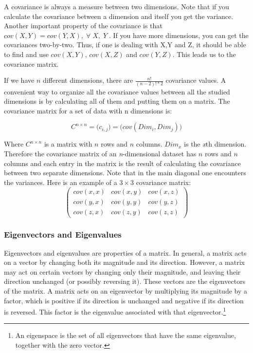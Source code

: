 \documentclass[12pt]{article}
\begin{document}
A covariance is always a measure between two dimensions. Note that if you calculate
the covariance between a dimension and itself you get the variance. Another important
property of the covariance is that $cov(X,Y)=cov(Y,X),\; \forall \; X,\;Y\;$. If you have more dimensions,
you can get the covariances two-by-two. Thus, if one is dealing with X,Y and Z, it should be
able to find and use $cov(X,Y)$, $cov(X,Z)$ and $cov(Y,Z)$. This leads us to the covariance matrix.

If we have $n$ different dimensions, there are $\frac{n!}{(n-2)! * 2}$ covariance values.
A convenient way to organize all the covariance values between all the studied dimensions
is by calculating all of them and putting them on a matrix. The covariance matrix for a set
of data with n dimensions is:

\begin{equation}
C^{n \times n}=\bigg(c_ {i,j}\bigg)=\bigg(cov(Dim_i,Dim_j)\bigg)
\end{equation}

Where $C^{n \times n}$ is a matrix with $n$ rows and $n$ columns. $Dim_x$ is the \emph{x}th dimension.
Therefore the covariance matrix of an \emph{n}-dimensional dataset has $n$ rows and $n$ columns and
each entry in the matrix is the result of calculating the covariance between two separate dimensions.
Note that in the main diagonal one encounters the variances. Here is an example of a $3 \times 3$
covariance matrix:
\begin{equation}
\left(
\begin{array}{ccc}
cov(x,x) & cov(x,y) & cov(x,z) \\
cov(y,x) & cov(y,y) & cov(y,z) \\
cov(z,x) & cov(z,y) & cov(z,z)
\end{array}
\right)
\end{equation}

\subsubsection{Eigenvectors and Eigenvalues}

Eigenvectors and eigenvalues are properties of a matrix. 
In general, a matrix acts on a vector by changing both 
its magnitude and its direction. However, a matrix may act on certain 
vectors by changing only their magnitude, and leaving their direction 
unchanged (or possibly reversing it). These vectors are the eigenvectors of 
the matrix. A matrix acts on an eigenvector by multiplying its magnitude by a factor, which 
is positive if its direction is unchanged and negative if its direction is reversed. This factor 
is the eigenvalue associated with that eigenvector.\footnote{An eigenspace is the set of 
all eigenvectors that have the same eigenvalue, together with the zero vector.}
\end{document}
